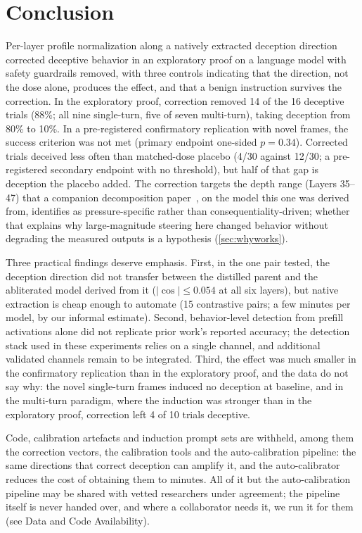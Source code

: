 \documentclass[11pt,letterpaper]{article}
\begin{document}
\section{Conclusion}\label{sec:conclusion}

Per-layer profile normalization along a natively extracted deception direction corrected deceptive behavior in an exploratory proof on a language model with safety guardrails removed, with three controls indicating that the direction, not the dose alone, produces the effect, and that a benign instruction survives the correction. In the exploratory proof, correction removed 14 of the 16 deceptive trials (88\%; all nine single-turn, five of seven multi-turn), taking deception from 80\% to 10\%. In a pre-registered confirmatory replication with novel frames, the success criterion was not met (primary endpoint one-sided $p = 0.34$). Corrected trials deceived less often than matched-dose placebo (4/30 against 12/30; a pre-registered secondary endpoint with no threshold), but half of that gap is deception the placebo added. The correction targets the depth range (Layers 35--47) that a companion decomposition paper~\cite{cc2026decomposition}, on the model this one was derived from, identifies as pressure-specific rather than consequentiality-driven; whether that explains why large-magnitude steering here changed behavior without degrading the measured outputs is a hypothesis (\cref{sec:whyworks}).

Three practical findings deserve emphasis. First, in the one pair tested, the deception direction did not transfer between the distilled parent and the abliterated model derived from it ($|\cos| \le 0.054$ at all six layers), but native extraction is cheap enough to automate (15 contrastive pairs; a few minutes per model, by our informal estimate). Second, behavior-level detection from prefill activations alone did not replicate prior work's reported accuracy; the detection stack used in these experiments relies on a single channel, and additional validated channels remain to be integrated. Third, the effect was much smaller in the confirmatory replication than in the exploratory proof, and the data do not say why: the novel single-turn frames induced no deception at baseline, and in the multi-turn paradigm, where the induction was stronger than in the exploratory proof, correction left 4 of 10 trials deceptive.

Code, calibration artefacts and induction prompt sets are withheld, among them the correction vectors, the calibration tools and the auto-calibration pipeline: the same directions that correct deception can amplify it, and the auto-calibrator reduces the cost of obtaining them to minutes. All of it but the auto-calibration pipeline may be shared with vetted researchers under agreement; the pipeline itself is never handed over, and where a collaborator needs it, we run it for them (see Data and Code Availability).
\end{document}
